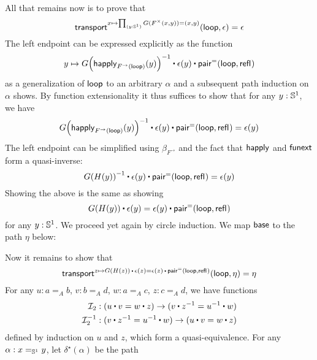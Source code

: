 \documentclass[
%
%
11pt %
]{article}
\newcommand{\nathom}[2]{\mathsf{nat}_{#1}(#2)}
\newcommand{\II}{\mathcal{I}_2}
\begin{document}
All that remains now is to prove that \[\transfib{x \mapsto \prd{y:\Sn^1} G(F^\times(x,y)) = (x,y)}{\lloop}{\epsilon} = \epsilon\] The left endpoint can be expressed explicitly as the function
\[ y \mapsto \opp{\ap{G}{\happly_{\ap{F^\to}{\lloop}}(y)}} \ct \epsilon(y) \ct \pairpath(\lloop,\refl{})\]
as a generalization of $\mathsf{loop}$ to an arbitrary $\alpha$ and a subsequent path induction on $\alpha$ shows. By function extensionality it thus suffices to show that for any $y : \mathbb{S}^1$, we have
\[ \opp{\ap{G}{\happly_{\ap{F^\to}{\lloop}}(y)}} \ct \epsilon(y) \ct \pairpath(\lloop,\refl{}) = \epsilon(y) \]
The left endpoint can be simplified using $\beta_{F^\to}$ and the fact that $\mathsf{happly}$ and $\mathsf{funext}$ form a quasi-inverse:
\[ \opp{\ap{G}{H(y)}} \ct \epsilon(y) \ct \pairpath(\lloop,\refl{}) = \epsilon(y) \]
Showing the above is the same as showing
\[ \ap{G}{H(y)} \ct \epsilon(y) = \epsilon(y) \ct \pairpath(\lloop,\refl{}) \]
for any $y :\mathbb{S}^1$. We proceed yet again by circle induction. We map $\mathsf{base}$ to the path $\eta$ below:
\begin{center}
\end{center}
Now it remains to show that
\[ \transfib{z \mapsto \ap{G}{H(z)} \ct \epsilon(z) = \epsilon(z) \ct \pairpath(\lloop,\refl{})}{\lloop}{\eta} = \eta \]
For any $u : a =_A b$, $v : b =_A d$, $w : a =_A c$, $z : c =_A d$, we have functions
\begin{align*}
\II & : (u \ct v = w \ct z) \to (v \ct \opp{z} = \opp{u} \ct w) \\
\II^{-1} & : (v \ct \opp{z} = \opp{u} \ct w) \to (u \ct v = w \ct z)
\end{align*}
defined by induction on $u$ and $z$, which form a quasi-equivalence.
For any $\alpha : x =_{\mathbb{S}^1} y$, let $\delta^\star(\alpha)$ be the path
\begin{center}
\end{center}
\end{document}
